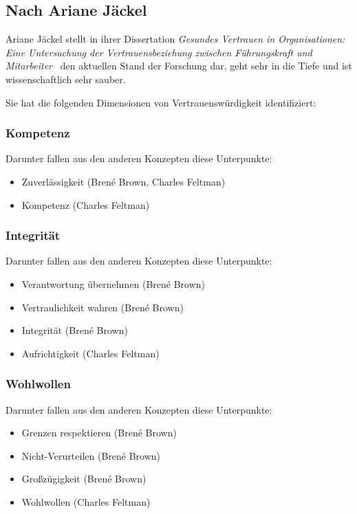 \subsection{Nach Ariane Jäckel}

Ariane Jäckel stellt in ihrer Dissertation \emph{Gesundes Vertrauen in Organisationen: Eine Untersuchung der Vertrauensbeziehung zwischen Führungskraft und Mitarbeiter}~\cite{gesundes-vertrauen-in-organisationen} den aktuellen Stand der Forschung dar, geht sehr in die Tiefe und ist wissenschaftlich sehr sauber.

Sie hat die folgenden Dimensionen von Vertrauenswürdigkeit identifiziert:

\subsubsection{Kompetenz}

Darunter fallen aus den anderen Konzepten diese Unterpunkte:

\begin{itemize}
    \item Zuverlässigkeit (Brené Brown, Charles Feltman)
    \item Kompetenz (Charles Feltman)
\end{itemize}

\subsubsection{Integrität}

Darunter fallen aus den anderen Konzepten diese Unterpunkte:

\begin{itemize}
    \item Verantwortung übernehmen (Brené Brown)
    \item Vertraulichkeit wahren (Brené Brown)
    \item Integrität (Brené Brown)
    \item Aufrichtigkeit (Charles Feltman)
\end{itemize}

\subsubsection{Wohlwollen}

Darunter fallen aus den anderen Konzepten diese Unterpunkte:

\begin{itemize}
    \item Grenzen respektieren (Brené Brown)
    \item Nicht-Verurteilen (Brené Brown)
    \item Großzügigkeit (Brené Brown)
    \item Wohlwollen (Charles Feltman)
\end{itemize}
